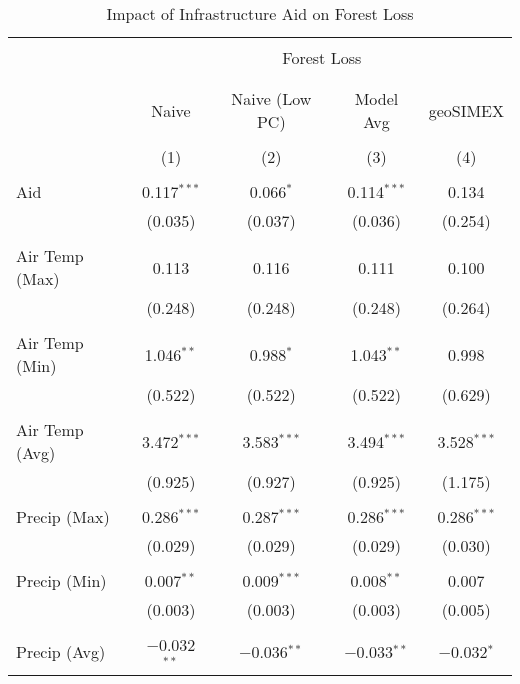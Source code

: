 
\begin{table}[!htbp] \centering 
  \caption{Impact of Infrastructure Aid on Forest Loss} 
  \label{seresults} 
\begin{tabular}{@{\extracolsep{5pt}}lcccc} 
\\[-1.8ex]\hline 
\hline \\[-1.8ex] 
 & \multicolumn{4}{c}{Forest Loss} \\ 
\cline{2-5} 
\\[-1.8ex] & \multicolumn{4}{c}{} \\ 
 & Naive & Naive (Low PC) & Model Avg & geoSIMEX \\ 
\\[-1.8ex] & (1) & (2) & (3) & (4)\\ 
\hline \\[-1.8ex] 
 Aid & 0.117$^{***}$ & 0.066$^{*}$ & 0.114$^{***}$ & 0.134 \\ 
  & (0.035) & (0.037) & (0.036) & (0.254) \\ 
  & & & & \\ 
 Air Temp (Max) & 0.113 & 0.116 & 0.111 & 0.100 \\ 
  & (0.248) & (0.248) & (0.248) & (0.264) \\ 
  & & & & \\ 
 Air Temp (Min) & 1.046$^{**}$ & 0.988$^{*}$ & 1.043$^{**}$ & 0.998 \\ 
  & (0.522) & (0.522) & (0.522) & (0.629) \\ 
  & & & & \\ 
 Air Temp (Avg) & 3.472$^{***}$ & 3.583$^{***}$ & 3.494$^{***}$ & 3.528$^{***}$ \\ 
  & (0.925) & (0.927) & (0.925) & (1.175) \\ 
  & & & & \\ 
 Precip (Max) & 0.286$^{***}$ & 0.287$^{***}$ & 0.286$^{***}$ & 0.286$^{***}$ \\ 
  & (0.029) & (0.029) & (0.029) & (0.030) \\ 
  & & & & \\ 
 Precip  (Min) & 0.007$^{**}$ & 0.009$^{***}$ & 0.008$^{**}$ & 0.007 \\ 
  & (0.003) & (0.003) & (0.003) & (0.005) \\ 
  & & & & \\ 
 Precip  (Avg) & $-$0.032$^{**}$ & $-$0.036$^{**}$ & $-$0.033$^{**}$ & $-$0.032$^{*}$ \\ 

\end{tabular}
\end{table}
